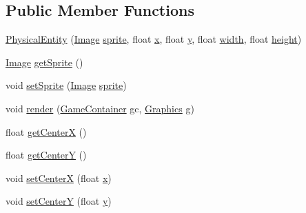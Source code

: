 \subsection*{Public Member Functions}
\begin{DoxyCompactItemize}
\item 
\mbox{\hyperlink{classentities_1_1_physical_entity_a1c391ef73853151741549826ce603409}{Physical\+Entity}} (\mbox{\hyperlink{classorg_1_1newdawn_1_1slick_1_1_image}{Image}} \mbox{\hyperlink{classentities_1_1_physical_entity_aeb439b2308ab19fb6d3ff6be6f7cdbd8}{sprite}}, float \mbox{\hyperlink{classorg_1_1newdawn_1_1slick_1_1geom_1_1_shape_a3e985bfff386c15a4efaad03d8ad60d3}{x}}, float \mbox{\hyperlink{classorg_1_1newdawn_1_1slick_1_1geom_1_1_shape_a9f934baded6a1b65ebb69e7e5f80ea00}{y}}, float \mbox{\hyperlink{classorg_1_1newdawn_1_1slick_1_1geom_1_1_rectangle_a967e1823f62daf45abb142779d1be62d}{width}}, float \mbox{\hyperlink{classorg_1_1newdawn_1_1slick_1_1geom_1_1_rectangle_a3bd010fdce636fc11ed0e0ad4d4b4a0a}{height}})
\item 
\mbox{\hyperlink{classorg_1_1newdawn_1_1slick_1_1_image}{Image}} \mbox{\hyperlink{classentities_1_1_physical_entity_a000f49cb01d375f5e5fc254249b1d836}{get\+Sprite}} ()
\item 
void \mbox{\hyperlink{classentities_1_1_physical_entity_a34d2f58a6004cbc4640ce0d61f1341d6}{set\+Sprite}} (\mbox{\hyperlink{classorg_1_1newdawn_1_1slick_1_1_image}{Image}} \mbox{\hyperlink{classentities_1_1_physical_entity_aeb439b2308ab19fb6d3ff6be6f7cdbd8}{sprite}})
\item 
void \mbox{\hyperlink{classentities_1_1_physical_entity_a69947328b7cf052e63fe2f8c367915df}{render}} (\mbox{\hyperlink{classorg_1_1newdawn_1_1slick_1_1_game_container}{Game\+Container}} gc, \mbox{\hyperlink{classorg_1_1newdawn_1_1slick_1_1_graphics}{Graphics}} g)
\item 
float \mbox{\hyperlink{classentities_1_1_physical_entity_ac084d1d2c3b6f810826b52ce42012a82}{get\+CenterX}} ()
\item 
float \mbox{\hyperlink{classentities_1_1_physical_entity_a5786e06f692199c9169b64eca2885683}{get\+CenterY}} ()
\item 
void \mbox{\hyperlink{classentities_1_1_physical_entity_aec517c801823101f42e990157de42780}{set\+CenterX}} (float \mbox{\hyperlink{classorg_1_1newdawn_1_1slick_1_1geom_1_1_shape_a3e985bfff386c15a4efaad03d8ad60d3}{x}})
\item 
void \mbox{\hyperlink{classentities_1_1_physical_entity_a97e4905f6a7806046dd2a9b96ca43e31}{set\+CenterY}} (float \mbox{\hyperlink{classorg_1_1newdawn_1_1slick_1_1geom_1_1_shape_a9f934baded6a1b65ebb69e7e5f80ea00}{y}})
\end{DoxyCompactItemize}
